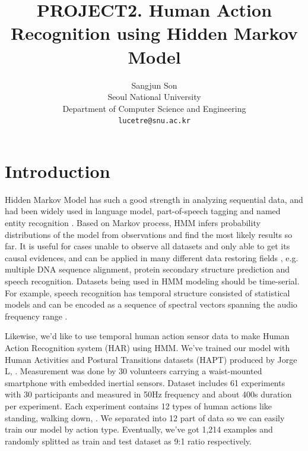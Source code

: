 \documentclass[10pt,twocolumn,letterpaper]{article}
\begin{document}
\title{PROJECT2. Human Action Recognition using Hidden Markov Model}

\author{Sangjun Son\\
Seoul National University\\
Department of Computer Science and Engineering\\
{\tt\small lucetre@snu.ac.kr}
}

\maketitle

\section{Introduction}

Hidden Markov Model has such a good strength in analyzing sequential data, and had been widely used in language model, part-of-speech tagging and named entity recognition \cite{ratgo}. Based on Markov process, HMM infers probability distributions of the model from observations and find the most likely results so far. It is useful for cases unable to observe all datasets and only able to get its causal evidences, and can be applied in many different data restoring fields \cite{wikipedia}, e.g. multiple DNA sequence alignment, protein secondary structure prediction \cite{biology} and speech recognition. Datasets being used in HMM modeling should be time-serial. For example, speech recognition has temporal structure consisted of statistical models and can be encoded as a sequence of spectral vectors spanning the audio frequency range \cite{speechrecognition}.

Likewise, we'd like to use temporal human action sensor data to make Human Action Recognition system (HAR) using HMM. We've trained our model with  Human Activities and Postural Transitions datasets (HAPT) produced by Jorge L, \etal \cite{hapt}. Measurement was done by 30 volunteers carrying a waist-mounted smartphone with embedded inertial sensors. Dataset includes 61 experiments with 30 participants and measured in 50Hz frequency and about 400s duration per experiment. Each experiment contains 12 types of human actions like standing, walking down, \etc. We separated into 12 part of data so we can easily train our model by action type. Eventually, we've got 1,214 examples and randomly splitted as train and test dataset as 9:1 ratio respectively.

\end{document}
